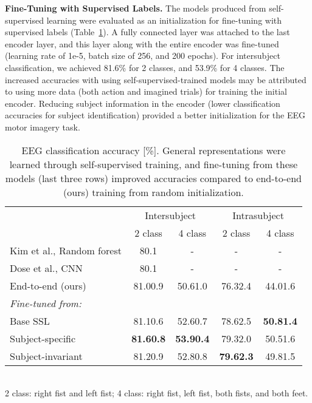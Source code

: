 \documentclass{article}
\newcommand{\std}[1]{{\scriptsize{#1}}}
\renewcommand{\paragraph}[1]{\textbf{#1}\hspace{1em}}
\begin{document}
\paragraph{Fine-Tuning with Supervised Labels.}
The models produced from self-supervised learning were evaluated as an
initialization for fine-tuning with supervised labels
(Table~\ref{table:eeg:finetune}). A fully connected layer was attached to the
last encoder layer, and this layer along with the entire encoder was fine-tuned
(learning rate of 1e-5, batch size of 256, and 200 epochs). For intersubject
classification, we achieved 81.6\% for 2 classes, and 53.9\% for 4 classes.
The increased accuracies with using self-supervised-trained models may be
attributed to using more data (both action and imagined trials) for training the
initial encoder.  Reducing subject information in the encoder (lower
classification accuracies for subject identification) provided a better
initialization for the EEG motor imagery task.



\begin{table}
  \centering
  \caption{EEG classification accuracy [\%]. General representations were
  learned through self-supervised training, and fine-tuning from these models
  (last three rows) improved accuracies compared to end-to-end (ours) training
  from random initialization.}
    \label{table:eeg:finetune}
  \small
  \begin{tabular}{lcccc}
    \toprule
    & \multicolumn{2}{c}{Intersubject} & \multicolumn{2}{c}{Intrasubject} \\
    \cmidrule(lr){2-3}\cmidrule(lr){4-5}
    & 2 class & 4 class & 2 class & 4 class \\
    \hline
    Kim et al., Random forest \cite{kim_motor_2016} & 80.1 & - & - & - \\
    Dose et al., CNN \cite{dose_deep_2018} & 80.1 & - & - & - \\


    End-to-end (ours)
& 81.0\std{0.9} & 50.6\std{1.0}
& 76.3\std{2.4} & 44.0\std{1.6}\\
    \hline
    \textit{Fine-tuned from:}\\

    \hspace{10pt}Base SSL
& 81.1\std{0.6} & 52.6\std{0.7}
& 78.6\std{2.5} & \textbf{50.8\std{1.4}} \\

    \hspace{10pt}Subject-specific
& \textbf{81.6\std{0.8}} & \textbf{53.9\std{0.4}}
& 79.3\std{2.0} & 50.5\std{1.6}\\

    \hspace{10pt}Subject-invariant
& 81.2\std{0.9} & 52.8\std{0.8}
& \textbf{79.6\std{2.3}} & 49.8\std{1.5} \\
    \bottomrule
  \end{tabular}\\
  \footnotesize{2 class: right fist and left fist; 4 class: right fist,
  left fist, both fists, and both feet.}
\end{table}
\end{document}
